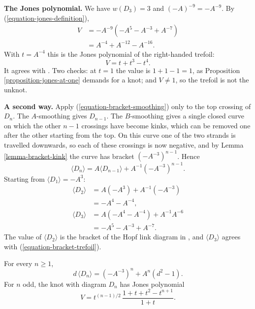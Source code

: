 \medskip\noindent
{\bf The Jones polynomial.} We have
$w(D_3)=3$ and
$(-A)^{-9}=-A^{-9}$. By
(\ref{equation-jones-definition}),
$$
\begin{aligned}
V
&=-A^{-9}
\left(-A^{5}-A^{-3}+A^{-7}\right)\\
&=A^{-4}+A^{-12}-A^{-16}.
\end{aligned}
$$
With $t=A^{-4}$ this is the Jones
polynomial of the right-handed trefoil:
\begin{equation}
\label{equation-jones-trefoil}
V=t+t^{3}-t^{4}.
\end{equation}
It agrees with
\cite[Example 11.1.1]{murasugi}. Two
checks: at $t=1$ the value is
$1+1-1=1$, as
Proposition \ref{proposition-jones-at-one}
demands for a knot; and $V\neq 1$, so
the trefoil is not the unknot.

\medskip\noindent
{\bf A second way.} Apply
(\ref{equation-bracket-smoothing}) only
to the top crossing of $D_n$. The
$A$-smoothing gives $D_{n-1}$. The
$B$-smoothing gives a single closed
curve on which the other $n-1$
crossings have become kinks, which can
be removed one after the other starting
from the top. On this curve one of the
two strands is travelled downwards, so
each of these crossings is now
negative, and by
Lemma \ref{lemma-bracket-kink} the
curve has bracket $(-A^{-3})^{n-1}$.
Hence
$$
\langle D_n\rangle
=A\langle D_{n-1}\rangle
+A^{-1}(-A^{-3})^{n-1}.
$$
Starting from
$\langle D_1\rangle=-A^{3}$:
$$
\begin{aligned}
\langle D_2\rangle
&=A(-A^{3})+A^{-1}(-A^{-3})\\
&=-A^{4}-A^{-4},\\
\langle D_3\rangle
&=A(-A^{4}-A^{-4})+A^{-1}A^{-6}\\
&=-A^{5}-A^{-3}+A^{-7}.
\end{aligned}
$$
The value of $\langle D_2\rangle$ is
the bracket of the Hopf link diagram in
\cite[p.\ 24]{lickorish}, and
$\langle D_3\rangle$ agrees with
(\ref{equation-bracket-trefoil}).

\begin{proposition}
\label{proposition-jones-two-n}
For every $n\geq 1$,
$$
d\,\langle D_n\rangle
=(-A^{-3})^{n}+A^{n}(d^{2}-1).
$$
For $n$ odd, the knot with diagram
$D_n$ has Jones polynomial
$$
V=
t^{(n-1)/2}\,
\frac{1+t+t^{2}-t^{n+1}}{1+t}.
$$
\end{proposition}

